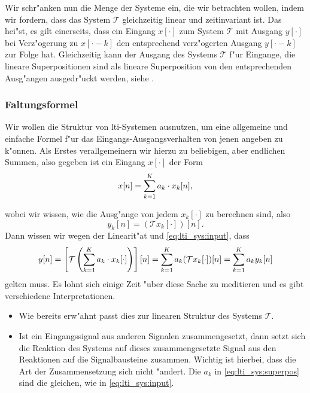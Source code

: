 
Wir schr"anken nun die Menge der Systeme ein, die wir betrachten wollen, indem wir fordern, dass das System $\mathcal{T}$ gleichzeitig linear und zeitinvariant ist.
Das hei"st, es gilt einerseits, dass ein Eingang $x[\cdot]$ zum System $\mathcal{T}$ mit Ausgang $y[\cdot]$ bei Verz"ogerung zu $x[\cdot - k]$ den entsprechend verz"ogerten Ausgang $y[\cdot - k]$ zur Folge hat.
Gleichzeitig kann der Ausgang des Systems $\mathcal{T}$ f"ur Eingange, die lineare Superpositionen sind als lineare Superposition von den entsprechenden Ausg"angen ausgedr"uckt werden, siehe .

\subsubsection{Faltungsformel}

Wir wollen die Struktur von \gls{lti}-Systemen ausnutzen, um eine allgemeine und einfache Formel f"ur das Eingangs-Ausgangsverhalten von jenen angeben zu k"onnen.
Als Erstes verallgemeinern wir hierzu  zu beliebigen, aber endlichen Summen, also gegeben ist ein Eingang $x[\cdot]$ der Form
\begin{equation}\label{eq:lti_sys:input}
    x[n] = {\sum\limits_{k=1}^{K}{a_k \cdot x_k[n]}},
\end{equation}

wobei wir wissen, wie die Ausg"ange von jedem $x_k[\cdot]$ zu berechnen sind, also
\[
    y_k[n] = (\mathcal{T}x_k[\cdot])[n].
\]
Dann wissen wir wegen der Linearit"at und \eqref{eq:lti_sys:input}, dass
\begin{equation}\label{eq:lti_sys:superpos}
    y[n] 
        = \left[\mathcal{T}\left(
            {\sum\limits_{k=1}^{K}{a_k \cdot x_k[\cdot]}}
        \right)\right][n] 
        = {\sum\limits_{k=1}^{K}{
            a_k (\mathcal{T}x_k[\cdot])[n]
        }}
        = {\sum\limits_{k=1}^{K}{
            a_k y_k[n]
        }}
\end{equation}
gelten muss.
Es lohnt sich einige Zeit "uber diese Sache zu meditieren und es gibt verschiedene Interpretationen.
\begin{itemize}
    \item Wie bereits erw"ahnt passt dies zur linearen Struktur des Systems $\mathcal{T}$.
    \item Ist ein Eingangssignal aus anderen Signalen zusammengesetzt, dann setzt sich die Reaktion des Systems auf dieses zusammengesetzte Signal aus den Reaktionen auf die Signalbausteine zusammen. 
    Wichtig ist hierbei, dass die Art der Zusammensetzung sich nicht "andert. Die $a_k$ in \eqref{eq:lti_sys:superpos} sind die gleichen, wie in \eqref{eq:lti_sys:input}.
\end{itemize}

